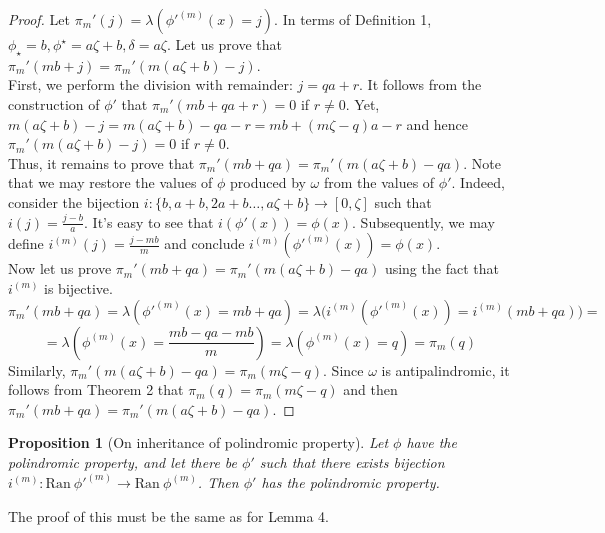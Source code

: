 \documentclass[a4paper]{article}
\theoremstyle{plain}
\newtheorem{proposition}{Proposition}
\theoremstyle{definition}
\begin{document}
\begin{proof}
Let $\pi_m'(j) = \lambda(\phi'^{(m)}(x)=j)$. In terms of Definition 1, $\phi_\star = b, \phi^\star = a\zeta + b, \delta = a\zeta$. Let us prove that $\pi_m'(mb + j) = \pi_m' (m(a\zeta+b)-j)$.\\
First, we perform the division with remainder: $j = qa + r$. It follows from the construction of $\phi'$ that $\pi_m'(mb + qa + r) = 0$ if $r \ne 0$. Yet, $m(a\zeta+b)-j = m(a\zeta+b)-qa - r = mb + (m\zeta -q)a - r$ and hence $\pi_m' (m(a\zeta+b)-j) = 0$ if $r \ne 0$.\\
Thus, it remains to prove that $\pi_m'(mb + qa) = \pi_m' (m(a\zeta+b)-qa)$.
Note that we may restore the values of $\phi$ produced by $\omega$ from the values of $\phi'$. Indeed, consider the bijection $i: \{b, a + b, 2a + b \ldots, a\zeta + b\} \rightarrow [0, \zeta]$ such that $i(j) = \frac{j-b}{a}$. It's easy to see that $i(\phi'(x))=\phi(x)$. Subsequently, we may define $i^{(m)}(j) = \frac{j-mb}{m}$ and conclude $i^{(m)}(\phi'^{(m)}(x))=\phi(x)$.\\
Now let us prove $\pi_m'(mb + qa) = \pi_m' (m(a\zeta+b)-qa)$ using the fact that $i^{(m)}$ is bijective.\\
\[\pi_m'(mb + qa) = \lambda(\phi'^{(m)}(x)=mb + qa) = \lambda\big(i^{(m)}(\phi'^{(m)}(x))=i^{(m)}(mb + qa)\big)  =\]\[= \lambda(\phi^{(m)}(x)= \frac{mb-qa-mb}{m})= \lambda(\phi^{(m)}(x)= q)=\pi_m(q)\]
Similarly, $\pi_m' (m(a\zeta+b)-qa) = \pi_m(m\zeta - q)$. Since $\omega$ is antipalindromic, it follows from Theorem 2 that $\pi_m(q) = \pi_m(m \zeta - q)$ and then $\pi_m'(mb + qa) = \pi_m' (m(a\zeta+b)-qa)$.
\end{proof}
\begin{proposition}[On inheritance of polindromic property]
Let $\phi$ have the polindromic property, and let there be $\phi'$ such that there exists bijection $i^{(m)}: \mathrm{Ran}\ \phi'^{(m)} \rightarrow \mathrm {Ran}\ \phi^{(m)}$. Then $\phi'$ has the polindromic property.
\end{proposition}
The proof of this must be the same as for Lemma 4.
\end{document}

